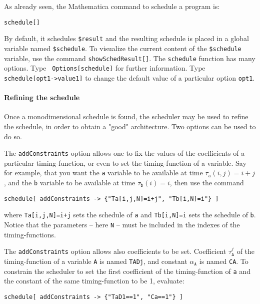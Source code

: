 \documentclass[12pt]{article}
\newcommand{\mma}{{Mathematica}}
\begin{document}
As already seen, 
the \mma{} command to schedule a program is:
\begin{verbatim}
schedule[]
\end{verbatim}
By
default, it schedules {\tt \$result} and the resulting schedule is
placed in a global variable named {\tt \$schedule}.  
To visualize the current content of the \texttt{\$schedule} variable, 
use the command \texttt{showSchedResult[]}.
The
\texttt{schedule} function has many options. 
Type {\tt
Options[schedule]} for further information. Type {\tt
schedule[opt1->value1]} to change the default value of a particular
option {\tt opt1}.

\paragraph*{Refining the schedule}
Once a monodimensional schedule is found, the scheduler
may be used to refine the schedule, in order to obtain 
a "good" architecture. Two options can be used to do so.

The \texttt{addConstraints} option allows one to fix the
values of the coefficients of a particular timing-function, or
even to set the timing-function of a variable. Say for example, 
that you want the \texttt{a} variable to be available 
at time $\tau_{\texttt{a}}(i,j) = i + j$, and the \texttt{b}
variable to be available at time $\tau_{\texttt{b}}(i) = i$, 
then use the command
\begin{verbatim}
schedule[ addConstraints -> {"Ta[i,j,N]=i+j", "Tb[i,N]=i"} ]
\end{verbatim}
where \texttt{Ta[i,j,N]=i+j} sets the schedule of \texttt{a}
and \texttt{Tb[i,N]=i} sets the schedule of \texttt{b}. Notice
that the parameters -- here \texttt{N} -- must be included in the indexes of the 
timing-functions. 

The \texttt{addConstraints} option allows also coefficients
to be set. Coefficient
$\tau^j_{{\texttt{A}}}$ of the timing-function of a 
variable \texttt{A} is named \texttt{TADj}, and constant 
$\alpha_{\texttt{A}}$ is named \texttt{CA}. 
To constrain the scheduler to set the first coefficient of the
timing-function of \texttt{a} and the constant of the 
same timing-function to be 1, evaluate: 
\begin{verbatim}
schedule[ addConstraints -> {"TaD1==1", "Ca==1"} ]
\end{verbatim}
\end{document}
